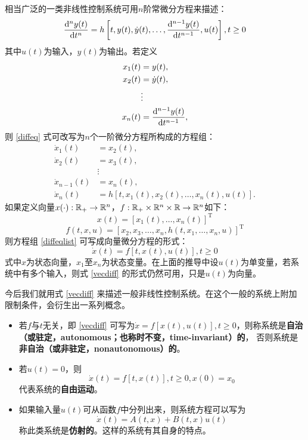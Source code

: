 相当广泛的一类非线性控制系统可用$n$阶常微分方程来描述：
\begin{equation}\label{diffeq}
  \frac{\mathop{}\!\mathrm{d}^n y(t)}{\mathop{}\!\mathrm{d} t^n}=h\left[t,y(t),\dot{y}(t),\dots,\frac{\mathop{}\!\mathrm{d}^{n-1} y(t)}{\mathop{}\!\mathrm{d} t^{n-1}},u(t)\right],t\ge 0
\end{equation}
其中$u(t)$为输入，$y(t)$为输出。若定义
\begin{align*}
  x_1(t)&=y(t),\\
  x_2(t)&=\dot{y}(t),\\
  &\vdots\\
  x_n(t)&=\frac{\mathop{}\!\mathrm{d}^{n-1} y(t)}{\mathop{}\!\mathrm{d} t^{n-1}},
\end{align*}
则 \eqref{diffeq} 式可改写为$n$个一阶微分方程所构成的方程组：
\begin{equation}\label{diffeqlist}
  \begin{aligned}
    \dot{x}_1(t)&=x_2(t),\\
    \dot{x}_2(t)&=x_3(t),\\
    &\vdots\\
    \dot{x}_{n-1}(t)&=x_n(t),\\
    \dot{x}_n(t)&=h\left[t,x_1(t),x_2(t),\dots,x_n(t),u(t)\right].
  \end{aligned}
\end{equation}
如果定义向量$x(\cdot):\mathbb{R}{}_+\to\mathbb{R}{}^n$，$f:\mathbb{R}{}_+\times\mathbb{R}{}^n\times\mathbb{R}{}\to\mathbb{R}{}^n$如下：
\[x(t)=[x_1(t),\dots,x_n(t)]^\mathrm{T}\]
\[f(t,x,u)=[x_2,x_3,\dots,x_n,h(t,x_1,\dots,x_n,u)]^\mathrm{T}\]
则方程组 \eqref{diffeqlist} 可写成向量微分方程的形式：
\begin{equation}\label{vecdiff}
  \dot{x}(t)=f[t,x(t),u(t)],t\ge 0
\end{equation}
式中$x$为状态向量，$x_1$至$x_n$为状态变量。在上面的推导中设$u(t)$为单变量，若系统中有多个输入，则式 \eqref{vecdiff} 的形式仍然可用，只是$u(t)$为向量。

今后我们就用式 \eqref{vecdiff} 来描述一般非线性控制系统。在这个一般的系统上附加限制条件，会衍生出一系列概念。

\begin{definition}\label{def:nonlinearconcepts}
  \begin{itemize}[leftmargin=1em]
    \item 若$f$与$t$无关，即 \eqref{vecdiff} 可写为$\dot{x}=f[x(t),u(t)],t\ge 0$，则称系统是{\bf 自治（或驻定，autonomous；也称时不变，time-invariant）的}，
    否则系统是{\bf 非自治（或非驻定，nonautonomous）的}。
    \item 若$u(t)=0$，则\begin{equation}\label{free}
      \dot{x}(t)=f[t,x(t)],t\ge 0,x(0)=x_0
    \end{equation}代表系统的{\bf 自由运动}。
    \item 如果输入量$u(t)$可从函数$f$中分列出来，则系统方程可以写为\[\dot{x}(t)=A(t,x)+B(t,x)u(t)\]称此类系统是{\bf 仿射的}。这样的系统有其自身的特点。
  \end{itemize}
\end{definition}


